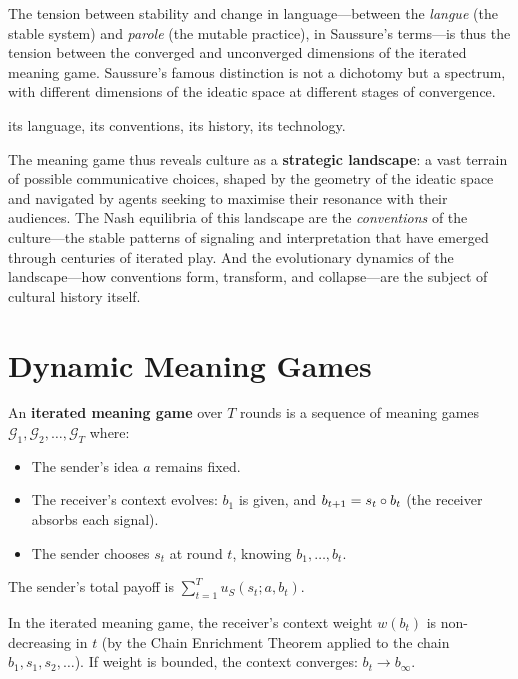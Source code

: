 \begin{interpretation}
\begin{interpretation}
The tension between stability and change in language---between the
\emph{langue} (the stable system) and \emph{parole} (the mutable
practice), in Saussure's terms---is thus the tension between the converged
and unconverged dimensions of the iterated meaning game.  Saussure's
famous distinction is not a dichotomy but a spectrum, with different
dimensions of the ideatic space at different stages of convergence.
\end{interpretation}


its language, its conventions, its history, its technology.

The meaning game thus reveals culture as a \textbf{strategic landscape}:
a vast terrain of possible communicative choices, shaped by the geometry of
the ideatic space and navigated by agents seeking to maximise their resonance
with their audiences.  The Nash equilibria of this landscape are the
\emph{conventions} of the culture---the stable patterns of signaling and
interpretation that have emerged through centuries of iterated play.  And
the evolutionary dynamics of the landscape---how conventions form, transform,
and collapse---are the subject of cultural history itself.
\end{interpretation}



\section{Dynamic Meaning Games}

\begin{definition}
\label{def:iterated-game}
An \textbf{iterated meaning game} over $T$ rounds is a sequence of meaning
games $\mathcal{G}_1, \mathcal{G}_2, \ldots, \mathcal{G}_T$ where:
\begin{itemize}
\item The sender's idea $a$ remains fixed.
\item The receiver's context evolves: $b_1$ is given, and
  $b_{t+1} = s_t \circ b_t$ (the receiver absorbs each signal).
\item The sender chooses $s_t$ at round $t$, knowing $b_1, \ldots, b_t$.
\end{itemize}
The sender's total payoff is $\sum_{t=1}^{T} u_S(s_t; a, b_t)$.
\end{definition}

\begin{theorem}
\label{thm:iterated-convergence}
In the iterated meaning game, the receiver's context weight
$w(b_t)$ is non-decreasing in $t$ (by the Chain Enrichment Theorem applied
to the chain $b_1, s_1, s_2, \ldots$).  If weight is bounded, the
context converges: $b_t \to b_{\infty}$.
\end{theorem}

